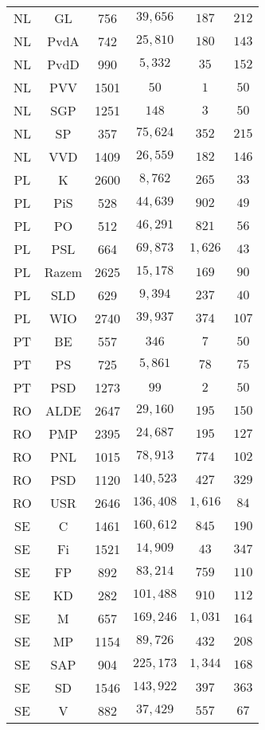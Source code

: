 \begin{table}[!htbp]
\begin{tabular}{@{\extracolsep{5pt}} cccccc}
NL & GL & 756 & $39,656$ & $187$ & $212$ \\ 
NL & PvdA & 742 & $25,810$ & $180$ & $143$ \\ 
NL & PvdD & 990 & $5,332$ & $35$ & $152$ \\ 
NL & PVV & 1501 & $50$ & $1$ & $50$ \\ 
NL & SGP & 1251 & $148$ & $3$ & $50$ \\ 
NL & SP & 357 & $75,624$ & $352$ & $215$ \\ 
NL & VVD & 1409 & $26,559$ & $182$ & $146$ \\ 
PL & K & 2600 & $8,762$ & $265$ & $33$ \\ 
PL & PiS & 528 & $44,639$ & $902$ & $49$ \\ 
PL & PO & 512 & $46,291$ & $821$ & $56$ \\ 
PL & PSL & 664 & $69,873$ & $1,626$ & $43$ \\ 
PL & Razem & 2625 & $15,178$ & $169$ & $90$ \\ 
PL & SLD & 629 & $9,394$ & $237$ & $40$ \\ 
PL & WIO & 2740 & $39,937$ & $374$ & $107$ \\ 
PT & BE & 557 & $346$ & $7$ & $50$ \\ 
PT & PS & 725 & $5,861$ & $78$ & $75$ \\ 
PT & PSD & 1273 & $99$ & $2$ & $50$ \\ 
RO & ALDE & 2647 & $29,160$ & $195$ & $150$ \\ 
RO & PMP & 2395 & $24,687$ & $195$ & $127$ \\ 
RO & PNL & 1015 & $78,913$ & $774$ & $102$ \\ 
RO & PSD & 1120 & $140,523$ & $427$ & $329$ \\ 
RO & USR & 2646 & $136,408$ & $1,616$ & $84$ \\ 
SE & C & 1461 & $160,612$ & $845$ & $190$ \\ 
SE & Fi & 1521 & $14,909$ & $43$ & $347$ \\ 
SE & FP & 892 & $83,214$ & $759$ & $110$ \\ 
SE & KD & 282 & $101,488$ & $910$ & $112$ \\ 
SE & M & 657 & $169,246$ & $1,031$ & $164$ \\ 
SE & MP & 1154 & $89,726$ & $432$ & $208$ \\ 
SE & SAP & 904 & $225,173$ & $1,344$ & $168$ \\ 
SE & SD & 1546 & $143,922$ & $397$ & $363$ \\ 
SE & V & 882 & $37,429$ & $557$ & $67$ \\ 

\end{tabular}
\end{table}
